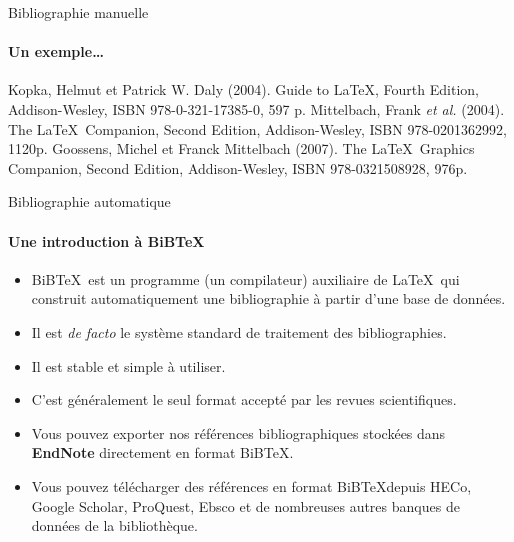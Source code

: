 \begin{frame}[fragile,c]{Bibliographie manuelle}
	\framesubtitle{Un exemple\ldots}
\begin{codesource}
	\begin{thebibliography}{99}		
			Kopka, Helmut et Patrick W. Daly (2004).
			\newblock Guide to \LaTeX, Fourth Edition,
			\newblock Addison-Wesley,
			\newblock ISBN 978-0-321-17385-0, 597 p.
			Mittelbach, Frank \emph{et al.} (2004).
			\newblock The \LaTeX\ Companion, Second Edition,
			\newblock Addison-Wesley,
			\newblock ISBN 978-0201362992, 1120p.
			Goossens, Michel et Franck Mittelbach (2007).
			\newblock The \LaTeX\ Graphics Companion, Second Edition,
			\newblock Addison-Wesley,
			\newblock ISBN 978-0321508928, 976p.
	\end{thebibliography}
\end{codesource}
\end{frame}

\begin{frame}[c]{Bibliographie automatique}
	\framesubtitle{Une introduction à BiB\TeX}
	
	\begin{itemize}
		\item BiB\TeX\ est un programme (un compilateur) auxiliaire de \LaTeX\ qui construit 
			automatiquement une bibliographie à partir d'une base de données.
		\item Il est \emph{de facto} le système standard de traitement des bibliographies.
		\item Il est stable et simple à utiliser.
		\item C'est généralement le seul format accepté par les revues scientifiques.
		\item Vous pouvez exporter nos références bibliographiques stockées dans \textbf{EndNote}
			directement en format BiB\TeX.
		\item Vous pouvez télécharger des références en format BiB\TeX depuis HECo, Google Scholar,
			ProQuest, Ebsco et de nombreuses autres banques de données de la bibliothèque.
	\end{itemize}
\end{frame}

